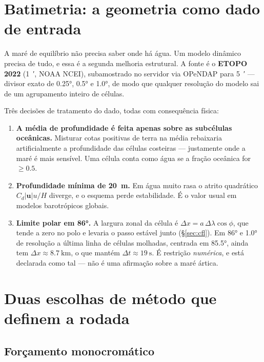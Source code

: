 \documentclass[11pt,a4paper,oneside]{report}
\theoremstyle{definition}
\theoremstyle{plain}
\theoremstyle{remark}
\newcommand{\vect}[1]{\bm{#1}}
\begin{document}
\section{Batimetria: a geometria como dado de entrada}
\label{sec:batimetria}

A maré de equilíbrio não precisa saber onde há água. Um modelo dinâmico precisa
de tudo, e essa é a segunda melhoria estrutural. A fonte é o \textbf{ETOPO 2022}
(\SI{1}{\arcminute}, NOAA NCEI), subamostrado no servidor via OPeNDAP para
\SI{5}{\arcminute} — divisor exato de \ang{0.25}, \ang{0.5} e \ang{1.0}, de
modo que qualquer resolução do modelo sai de um agrupamento inteiro de células.

Três decisões de tratamento do dado, todas com consequência física:

\begin{enumerate}
\item \textbf{A média de profundidade é feita apenas sobre as subcélulas
  oceânicas.} Misturar cotas positivas de terra na média rebaixaria
  artificialmente a profundidade das células costeiras — justamente onde a maré
  é mais sensível. Uma célula conta como água se a fração oceânica for
  $\ge\num{0.5}$.
\item \textbf{Profundidade mínima de \SI{20}{\meter}.} Em água muito rasa o
  atrito quadrático $C_d|\vect{u}|u/H$ diverge, e o esquema perde estabilidade.
  É o valor usual em modelos barotrópicos globais.
\item \textbf{Limite polar em \ang{86}.} A largura zonal da célula é
  $\Delta x=a\,\Delta\lambda\cos\phi$, que tende a zero no polo e levaria o
  passo estável junto (\S\ref{sec:cfl}). Em \ang{86} e \ang{1.0} de resolução a
  última linha de células molhadas, centrada em \ang{85.5}, ainda tem
  $\Delta x\approx\SI{8.7}{\kilo\meter}$, o que mantém
  $\Delta t\approx\SI{19}{\second}$. É restrição \emph{numérica}, e está
  declarada como tal — não é uma afirmação sobre a maré ártica.
\end{enumerate}

\section{Duas escolhas de método que definem a rodada}

\subsection{Forçamento monocromático}
\label{sec:monocromatico}
\end{document}
